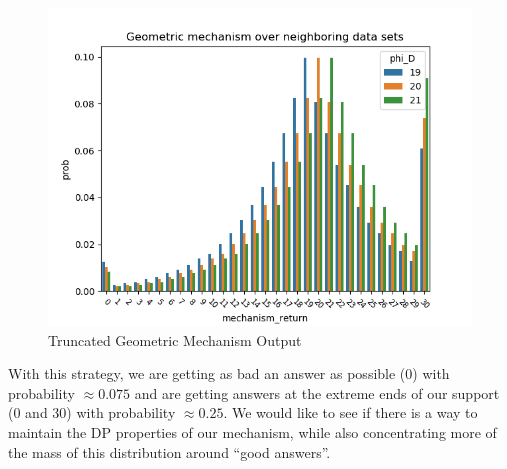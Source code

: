 \documentclass[11pt]{scrartcl} %
\begin{document}
\begin{figure}[h]
    \includegraphics[width = \textwidth]{truncated_geometric_mech_dist.png}
    \caption{Truncated Geometric Mechanism Output}
\end{figure}
With this strategy, we are getting as bad an answer as possible (0) with probability $\approx 0.075$ and are
getting answers at the extreme ends of our support (0 and 30) with probability $\approx 0.25$.
We would like to see if there is a way to maintain the DP properties of our mechanism, while also
concentrating more of the mass of this distribution around ``good answers''. \newline
\end{document}

